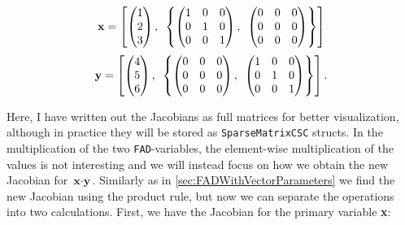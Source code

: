 \begin{multicols}{2}
    \noindent
    \begin{align*}
        \textbf{x} = \left[\begin{pmatrix}1\\2\\3
        \end{pmatrix},\hspace{0.5em}\left\{
        \begin{pmatrix}
        1&0&0\\
        0&1&0\\
        0&0&1\end{pmatrix},\hspace{0.5em}\begin{pmatrix}
        0&0&0\\
        0&0&0\\
        0&0&0
        \end{pmatrix}\right\} \right]
    \end{align*}
    \begin{align*}
        \textbf{y} = \left[\begin{pmatrix}4\\5\\6
        \end{pmatrix},\hspace{0.5em}\left\{
        \begin{pmatrix}
        0&0&0\\
        0&0&0\\
        0&0&0\end{pmatrix},\hspace{0.5em}\begin{pmatrix}
        1&0&0\\
        0&1&0\\
        0&0&1
        \end{pmatrix}\right\} \right].
    \end{align*}
\end{multicols}
Here, I have written out the Jacobians as full matrices for better visualization, although in practice they will be stored as \texttt{SparseMatrixCSC} structs. In the multiplication of the two \texttt{FAD}-variables, the element-wise multiplication of the values is not interesting and we will instead focus on how we obtain the new Jacobian for $\textbf{x}\cdot \textbf{y}$. Similarly as in \autoref{sec:FADWithVectorParameters} we find the new Jacobian using the product rule, but now we can separate the operations into two calculations. First, we have the Jacobian for the primary variable \textbf{x}:
